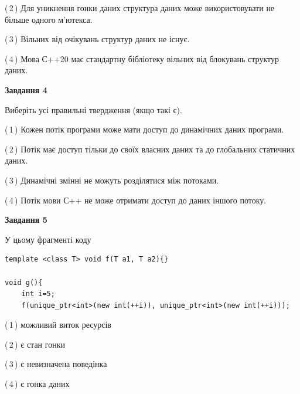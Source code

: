 \documentclass[12pt, ukrainian]{article}
\begin{document}
\begin {large}
{(\,2\,) Для уникнення гонки даних структура даних може використовувати не більше одного м’ютекса.%

(\,3\,) Вільних від очікувань структур даних не існує.%

(\,4\,) Мова С++20 має стандартну бібліотеку вільних від блокувань структур даних.%



\begin{center}
\textbf{Завдання 4}
\end{center}
Виберіть усі правильні твердження (якщо такі є).\par
\vspace{2mm}

(\,1\,) Кожен потік програми може мати доступ до динамічних даних програми.%

(\,2\,) Потік має доступ тільки до своїх власних даних та до глобальних статичних даних.%

(\,3\,) Динамічні змінні не можуть розділятися між потоками.%

(\,4\,) Потік мови С++ не може отримати доступ до даних іншого потоку.%



\begin{center}
\textbf{Завдання 5}
\end{center}
У цьому фрагменті коду
\begin{verbatim}
template <class T> void f(T a1, T a2){}

void g(){
    int i=5;
    f(unique_ptr<int>(new int(++i)), unique_ptr<int>(new int(++i)));
\end{verbatim}

(\,1\,) можливий виток ресурсів%

(\,2\,) є стан гонки%

(\,3\,) є невизначена поведінка%

(\,4\,) є гонка даних%


}
\end {large}
\end{document}
